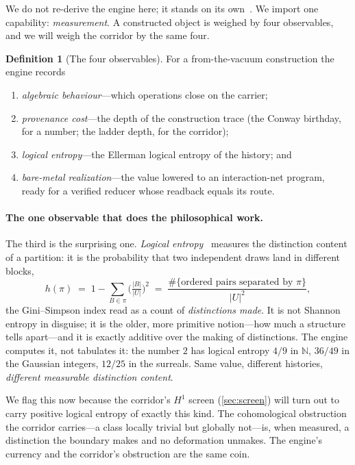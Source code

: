 \documentclass[11pt,letterpaper]{article}
\theoremstyle{plain}
\theoremstyle{definition}
\newtheorem{definition}[theorem]{Definition}
\theoremstyle{remark}
\newcommand{\NN}{\mathbb{N}}
\newcommand{\Llog}{h}                                   %
\begin{document}
We do not re-derive the engine here; it stands on its own~\citep{iaom_every_number}.
We import one capability: \emph{measurement}. A constructed object is weighed by
four observables, and we will weigh the corridor by the same four.

\begin{definition}[The four observables]\label{def:observables}
For a from-the-vacuum construction the engine records
\begin{enumerate}[label=(\roman*), nosep, leftmargin=2.2em]
  \item \emph{algebraic behaviour}---which operations close on the carrier;
  \item \emph{provenance cost}---the depth of the construction trace (the Conway
        birthday, for a number; the ladder depth, for the corridor);
  \item \emph{logical entropy}---the Ellerman logical entropy of the history; and
  \item \emph{bare-metal realization}---the value lowered to an interaction-net
        program, ready for a verified reducer whose readback equals its route.
\end{enumerate}
\end{definition}

\paragraph{The one observable that does the philosophical work.}
The third is the surprising one. \emph{Logical entropy}~\citep{ellerman2009counting,
ellerman2018logical} measures the distinction content of a partition: it is the
probability that two independent draws land in different blocks,
\begin{equation}\label{eq:logical-entropy}
  \Llog(\pi) \;=\; 1 - \sum_{B \in \pi} \Big(\tfrac{|B|}{|U|}\Big)^{2}
  \;=\; \frac{\#\{\text{ordered pairs separated by }\pi\}}{|U|^{2}},
\end{equation}
the Gini--Simpson index read as a count of \emph{distinctions made}. It is not
Shannon entropy in disguise; it is the older, more primitive notion---how much a
structure tells apart---and it is exactly additive over the making of
distinctions. The engine computes it, not tabulates it: the number $2$ has
logical entropy $4/9$ in $\NN$, $36/49$ in the Gaussian integers, $12/25$ in the
surreals. Same value, different histories, \emph{different measurable distinction
content}.

We flag this now because the corridor's $H^1$ screen
(\cref{sec:screen}) will turn out to carry positive logical entropy of exactly
this kind. The cohomological obstruction the corridor carries---a
class locally trivial but globally not---is, when measured, a distinction the
boundary makes and no deformation unmakes. The engine's currency and the
corridor's obstruction are the same coin.
\end{document}
